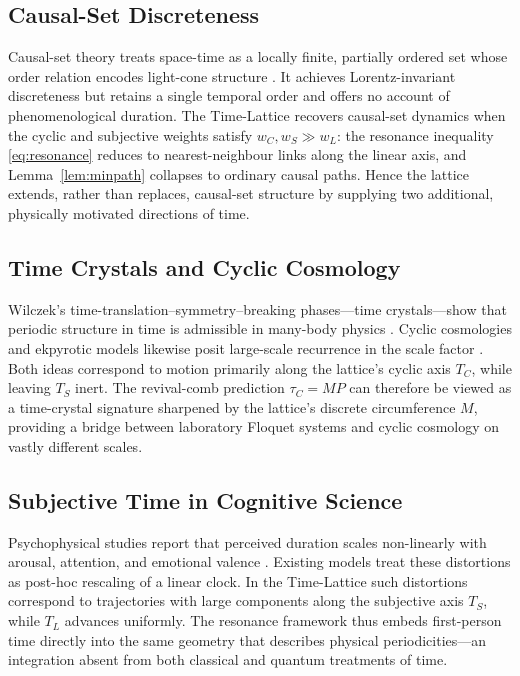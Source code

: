 \documentclass[11pt]{article}
\begin{document}
\subsection{Causal-Set Discreteness}
Causal-set theory treats space-time as a locally finite, partially ordered
set whose order relation encodes light-cone structure
\cite{Bombelli1987,Henson2009}.  It achieves Lorentz-invariant
discreteness but retains a single temporal order and offers no account of
phenomenological duration.  The Time-Lattice recovers causal-set dynamics
when the cyclic and subjective weights satisfy $w_C,w_S\!\gg\!w_L$:
the resonance inequality \eqref{eq:resonance} reduces to nearest-neighbour
links along the linear axis, and Lemma~\ref{lem:minpath} collapses to
ordinary causal paths.  Hence the lattice extends, rather than replaces,
causal-set structure by supplying two additional, physically motivated
directions of time.

\subsection{Time Crystals and Cyclic Cosmology}
Wilczek’s time-translation\hspace{0pt}–\hspace{0pt}symmetry\hspace{0pt}–\hspace{0pt}breaking phases—time crystals—show\hspace{0pt}\cite{Wilczek2012}
that periodic structure in time is admissible in many-body physics
\cite{Wilczek2012,Yao2020}.  Cyclic cosmologies and ekpyrotic models
likewise posit large-scale recurrence in the scale factor
\cite{Khoury2001,Biswas2013}.  Both ideas correspond to motion primarily
along the lattice’s cyclic axis $T_C$, while leaving $T_S$ inert.
The revival-comb prediction $\tau_C = MP$ can therefore be viewed as a
time-crystal signature sharpened by the lattice’s discrete circumference
$M$, providing a bridge between laboratory Floquet systems and cyclic
cosmology on vastly different scales.

\subsection{Subjective Time in Cognitive Science}
Psychophysical studies report that perceived duration scales
non-linearly with arousal, attention, and emotional valence
\cite{Eagleman2008,Wittmann2016}.  Existing models treat these distortions
as post-hoc rescaling of a linear clock.  In the Time-Lattice such
distortions correspond to trajectories with large components along the
subjective axis $T_S$, while $T_L$ advances uniformly.  The resonance
framework thus embeds first-person time directly into the same geometry
that describes physical periodicities—an integration absent from both
classical and quantum treatments of time.
\end{document}

